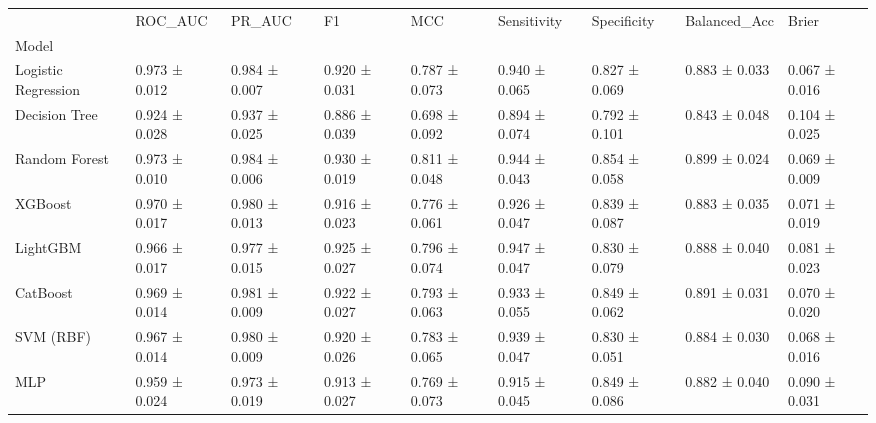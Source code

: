 \begin{tabular}{lllllllll}
\toprule
 & ROC_AUC & PR_AUC & F1 & MCC & Sensitivity & Specificity & Balanced_Acc & Brier \\
Model &  &  &  &  &  &  &  &  \\
\midrule
Logistic Regression & 0.973 ± 0.012 & 0.984 ± 0.007 & 0.920 ± 0.031 & 0.787 ± 0.073 & 0.940 ± 0.065 & 0.827 ± 0.069 & 0.883 ± 0.033 & 0.067 ± 0.016 \\
Decision Tree & 0.924 ± 0.028 & 0.937 ± 0.025 & 0.886 ± 0.039 & 0.698 ± 0.092 & 0.894 ± 0.074 & 0.792 ± 0.101 & 0.843 ± 0.048 & 0.104 ± 0.025 \\
Random Forest & 0.973 ± 0.010 & 0.984 ± 0.006 & 0.930 ± 0.019 & 0.811 ± 0.048 & 0.944 ± 0.043 & 0.854 ± 0.058 & 0.899 ± 0.024 & 0.069 ± 0.009 \\
XGBoost & 0.970 ± 0.017 & 0.980 ± 0.013 & 0.916 ± 0.023 & 0.776 ± 0.061 & 0.926 ± 0.047 & 0.839 ± 0.087 & 0.883 ± 0.035 & 0.071 ± 0.019 \\
LightGBM & 0.966 ± 0.017 & 0.977 ± 0.015 & 0.925 ± 0.027 & 0.796 ± 0.074 & 0.947 ± 0.047 & 0.830 ± 0.079 & 0.888 ± 0.040 & 0.081 ± 0.023 \\
CatBoost & 0.969 ± 0.014 & 0.981 ± 0.009 & 0.922 ± 0.027 & 0.793 ± 0.063 & 0.933 ± 0.055 & 0.849 ± 0.062 & 0.891 ± 0.031 & 0.070 ± 0.020 \\
SVM (RBF) & 0.967 ± 0.014 & 0.980 ± 0.009 & 0.920 ± 0.026 & 0.783 ± 0.065 & 0.939 ± 0.047 & 0.830 ± 0.051 & 0.884 ± 0.030 & 0.068 ± 0.016 \\
MLP & 0.959 ± 0.024 & 0.973 ± 0.019 & 0.913 ± 0.027 & 0.769 ± 0.073 & 0.915 ± 0.045 & 0.849 ± 0.086 & 0.882 ± 0.040 & 0.090 ± 0.031 \\
\bottomrule
\end{tabular}
